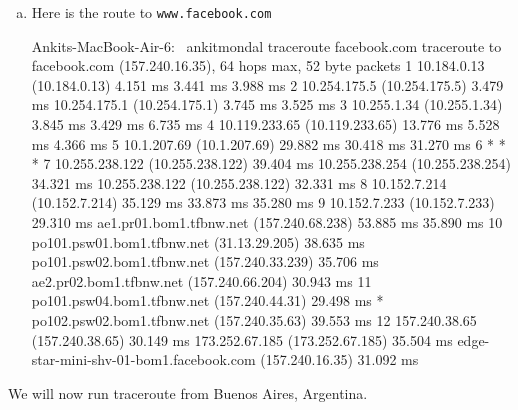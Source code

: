 \documentclass{article}
\begin{document}
\begin{enumerate}[a.]
\item Here is the route to {\tt www.facebook.com}
\begin{code}
Ankits-MacBook-Air-6:~ ankitmondal traceroute facebook.com
traceroute to facebook.com (157.240.16.35), 64 hops max, 52 byte packets
 1  10.184.0.13 (10.184.0.13)  4.151 ms  3.441 ms  3.988 ms
 2  10.254.175.5 (10.254.175.5)  3.479 ms
    10.254.175.1 (10.254.175.1)  3.745 ms  3.525 ms
 3  10.255.1.34 (10.255.1.34)  3.845 ms  3.429 ms  6.735 ms
 4  10.119.233.65 (10.119.233.65)  13.776 ms  5.528 ms  4.366 ms
 5  10.1.207.69 (10.1.207.69)  29.882 ms  30.418 ms  31.270 ms
 6  * * *
 7  10.255.238.122 (10.255.238.122)  39.404 ms
    10.255.238.254 (10.255.238.254)  34.321 ms
    10.255.238.122 (10.255.238.122)  32.331 ms
 8  10.152.7.214 (10.152.7.214)  35.129 ms  33.873 ms  35.280 ms
 9  10.152.7.233 (10.152.7.233)  29.310 ms
    ae1.pr01.bom1.tfbnw.net (157.240.68.238)  53.885 ms  35.890 ms
10  po101.psw01.bom1.tfbnw.net (31.13.29.205)  38.635 ms
    po101.psw02.bom1.tfbnw.net (157.240.33.239)  35.706 ms
    ae2.pr02.bom1.tfbnw.net (157.240.66.204)  30.943 ms
11  po101.psw04.bom1.tfbnw.net (157.240.44.31)  29.498 ms *
    po102.psw02.bom1.tfbnw.net (157.240.35.63)  39.553 ms
12  157.240.38.65 (157.240.38.65)  30.149 ms
    173.252.67.185 (173.252.67.185)  35.504 ms
    edge-star-mini-shv-01-bom1.facebook.com (157.240.16.35)  31.092 ms
\end{code}
\end{enumerate}
We will now run traceroute from Buenos Aires, Argentina.
\end{document}
